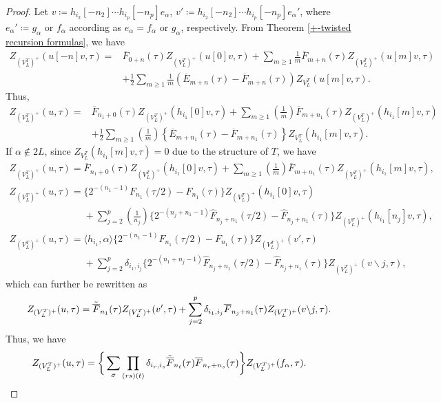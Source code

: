 \documentclass[pdftex]{sigma}
\numberwithin{equation}{section}
\theoremstyle{definition}
\begin{document}
\begin{proof}
Let
$v\coloneqq h_{i_2}[-n_2]\cdots h_{i_p}[-n_p]e_{\alpha}$,
$v'\coloneqq h_{i_2}[-n_2]\cdots h_{i_p}[-n_p]e_{\alpha}'$,
where $e_{\alpha}'\coloneqq g_{\alpha}$ or $f_{\alpha}$ according as $e_{\alpha}=f_{\alpha}$ or $g_{\alpha}$, respectively.
From Theorem \ref{+-twisted recursion formulas}, we have
 \begin{align*}
 Z_{(V_L^T)^+}(u[-n]v,\tau)={}&\overline{F}_{0+n}(\tau)Z_{(V_L^T)^+}(u[0]v,\tau)+\sum_{m\geq 1}\frac{1}{m}\overline{F}_{m+n}(\tau)Z_{(V_L^T)^+}(u[m]v,\tau)\\
 &+\frac{1}{2}\sum_{m\geq 1}\frac{1}{m}\left(\overline{E}_{m+n}(\tau)-\overline{F}_{m+n}(\tau)\right)Z_{V_L^T}(u[m]v, \tau).
 \end{align*}
Thus,
 \begin{align*}
 Z_{(V_L^T)^+}(u,\tau)={}&\overline{F}_{n_1+0}(\tau)Z_{(V_L^T)^+}(h_{i_1}[0]v,\tau)+\sum_{m\geq 1}\left(\frac{1}{m}\right)\overline{F}_{m+n_1}(\tau)Z_{(V_L^T)^+}(h_{i_1}[m]v,\tau)\\
&+\frac{1}{2}\sum_{m\geq 1}\left(\frac{1}{m}\right)\left\{\overline{E}_{m+n_1}(\tau)-\overline{F}_{m+n_1}(\tau)\right\}Z_{V_L^T}(h_{i_1}[m]v, \tau).
\end{align*}
If $\alpha\notin 2L$, since $Z_{V_L^T}(h_{i_1}[m]v, \tau)=0$ due to the structure of $T$, we have
\begin{gather*}
Z_{(V_L^T)^+}(u,\tau)=\overline{F}_{n_1+0}(\tau)Z_{(V_L^T)^+}(h_{i_1}[0]v,\tau)+\sum_{m\geq 1}\left(\frac{1}{m}\right)\overline{F}_{m+n_1}(\tau)Z_{(V_L^T)^+}(h_{i_1}[m]v,\tau),
\\
Z_{(V_L^T)^+}(u,\tau)=\bigl\{2^{-(n_1-1)}{F}_{n_1}(\tau/2) -{F}_{n_1}(\tau)\bigr\}Z_{(V_L^T)^+}(h_{i_1}[0]v,\tau)\\
\phantom{Z_{(V_L^T)^+}(u,\tau)=}{}+\sum_{j=2}^p\left(\frac{1}{n_j}\right)\bigl\{2^{-(n_j+n_1-1)}\hat{F}_{n_j+n_1}(\tau/2) -\hat{F}_{n_j+n_1}(\tau)\bigr\}Z_{(V_L^T)^+}(h_{i_1}[n_j]v,\tau),\\
Z_{(V_L^T)^+}(u,\tau)=\langle h_{i_1},\alpha\rangle\bigl\{2^{-(n_1-1)}{F}_{n_1}(\tau/2) -{F}_{n_1}(\tau)\bigr\}Z_{(V_L^T)^+}(v',\tau)\\
\phantom{Z_{(V_L^T)^+}(u,\tau)=}{}+\sum_{j=2}^p\delta_{i_1,i_j}\bigl\{2^{-(n_1+n_j-1)}\hat{F}_{n_j+n_1}(\tau/2) -\hat{F}_{n_j+n_1}(\tau)\bigr\}Z_{(V_L^T)^+}(v\backslash j,\tau),
\end{gather*}
which can further be rewritten as
\[Z_{(V_L^T)^+}(u,\tau)=\Tilde{\overline{F}}_{n_1}(\tau)Z_{(V_L^T)^+}(v',\tau)+\sum_{j=2}^p \delta_{i_1,i_j}\overline{F}_{n_j+n_1}(\tau)Z_{(V_L^T)^+}(v\backslash j,\tau).\]
Thus, we have
\[
Z_{(V_L^T)^+}(u,\tau)=\bigg\{\sum_{\sigma} \prod_{(rs)(t)}\delta_{i_r,i_s}\Tilde{\overline{F}}_{n_t}(\tau)
\overline{F}_{n_r+n_s}(\tau)\bigg\}Z_{(V_L^T)^+}(f_{\alpha},\tau).\tag*{\qed}
\]\renewcommand{\qed}{}
\end{proof}
\end{document}
